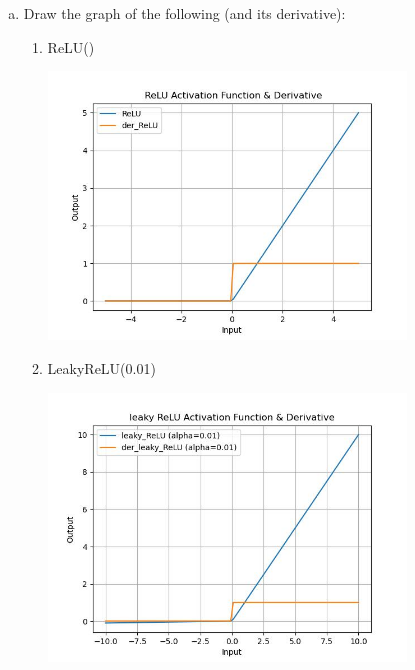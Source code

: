 \documentclass{article}
\begin{document}
\begin{enumerate}[(a)]
  \item Draw the graph of the following (and its derivative):
        \begin{enumerate}
          \item ReLU()
                \begin{tcolorbox}
                  \includegraphics[width=9.5cm]{relu.jpg}
                \end{tcolorbox}
          \item LeakyReLU(0.01)
                \begin{tcolorbox}
                  \includegraphics[width=9.5cm]{leaky_relu.jpg}
                \end{tcolorbox}


\end{enumerate}
\end{enumerate}
\end{document}
